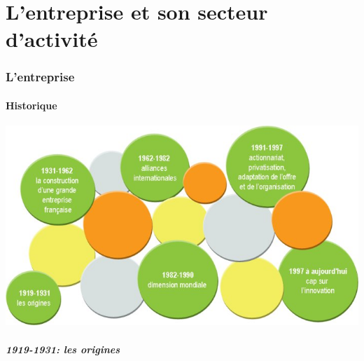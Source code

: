 \documentclass{article}
\begin{document}
\part{L'entreprise et son secteur d'activité}
	\section{L'entreprise}
		\subsection{Historique}
		\begin{center}
		\includegraphics[scale=0.5]{histoire_fr.jpg}
		\end{center}
		\subsubsection{1919-1931: les origines}
\end{document}
